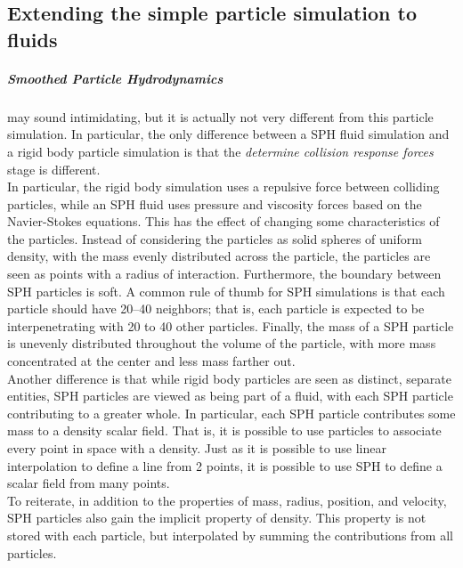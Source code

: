 \documentclass[]{article}
\begin{document}
	\subsection{Extending the simple particle simulation to fluids}
	\subparagraph{\textit{Smoothed Particle Hydrodynamics}} may sound intimidating, but it is actually not very different from 
	this particle simulation. In particular, the only difference between a SPH fluid simulation and a rigid body particle 
	simulation is that the \textit{determine collision response forces} stage is different.\\
	
	In particular, the rigid body simulation uses a repulsive force between colliding particles, while an SPH fluid uses
	pressure and viscosity forces based on the Navier-Stokes equations. This has the effect of changing some 
	characteristics of the particles. Instead of considering the particles as solid spheres of uniform density, with the
	mass evenly distributed across the particle, the particles are seen as points with a radius of interaction. 
	Furthermore, the boundary between SPH particles is soft. A common rule of thumb for SPH simulations is that each 
	particle should have 20--40 neighbors; that is, each particle is expected to be interpenetrating with 20 to 40 other
	particles. Finally, the mass of a SPH particle is unevenly distributed throughout the volume of the particle, with
	more mass concentrated at the center and less mass farther out.\\
	
	Another difference is that while rigid body particles are seen as distinct, separate entities, SPH particles are 
	viewed as being part of a fluid, with each SPH particle contributing to a greater whole. In particular, each SPH 
	particle contributes some mass to a density scalar field. That is, it is possible to use particles to associate 
	every point in space with a density. Just as it is possible to use linear interpolation to define a line from 2 
	points, it is possible to use SPH to define a scalar field from many points.\\
	
	To reiterate, in addition to the properties of mass, radius, position, and velocity, SPH particles also gain the 
	implicit property of density. This property is not stored with each particle, but interpolated by summing the 
	contributions from all particles.\\
	
\end{document}
